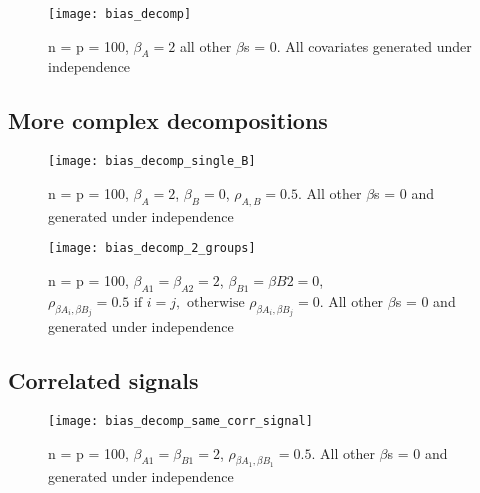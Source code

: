 \begin{figure}[hbtp]
    \begin{center}
    \texttt{[image: bias\_decomp]}
    \caption{\label{Fig:bias_decomp} n = p = 100, $\beta_A = 2$ all other $\beta$s = 0. All covariates generated under independence}
    \end{center}
\end{figure}

\newpage

\subsection{More complex decompositions}

\begin{figure}[hbtp]
    \begin{center}
    \texttt{[image: bias\_decomp\_single\_B]}
    \caption{\label{Fig:bias_decomp_single_B} n = p = 100, $\beta_A = 2$, $\beta_B = 0$, $\rho_{A,B} = 0.5$.  All other $\beta$s = 0 and  generated under independence}
    \end{center}
\end{figure}

\begin{figure}[hbtp]
    \begin{center}
    \texttt{[image: bias\_decomp\_2\_groups]}
    \caption{\label{Fig:bias_decomp_2_groups} n = p = 100, $\beta_{A1} = \beta_{A2} = 2$, $\beta_{B1} = \beta{B2} = 0$, $\rho_{\beta{A_i},\beta{B_j}} = 0.5 \text{ if } i=j, \text{ otherwise } \rho_{\beta{A_i},\beta{B_j}} = 0$.  All other $\beta$s = 0 and  generated under independence}
    \end{center}
\end{figure}

\newpage

\subsection{Correlated signals}

\begin{figure}[hbtp]
    \begin{center}
    \texttt{[image: bias\_decomp\_same\_corr\_signal]}
    \caption{\label{Fig:bias_decomp_same_corr_signal} n = p = 100, $\beta_{A1} = \beta_{B1} = 2$, $\rho_{\beta{A_1},\beta{B_1}} = 0.5$.  All other $\beta$s = 0 and  generated under independence}
    \end{center}
\end{figure}

